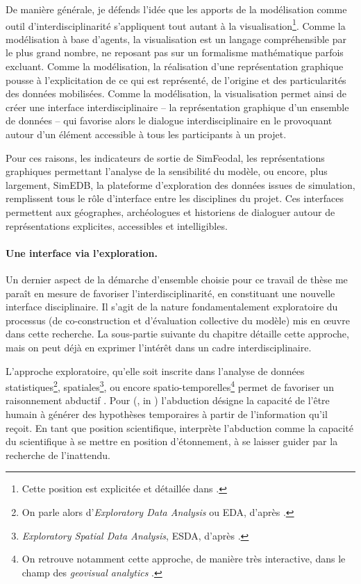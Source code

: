 De manière générale, je défends l'idée que les apports de la modélisation comme outil d'interdisciplinarité s'appliquent tout autant à la visualisation\footnote{
	Cette position est explicitée et détaillée dans \textcite{cura_visualisation_2020}.
}.
Comme la modélisation à base d'agents, la visualisation est un \og langage\fg{} compréhensible par le plus grand nombre, ne reposant pas sur un formalisme mathématique parfois excluant.
Comme la modélisation, la réalisation d'une représentation graphique pousse à l'explicitation de ce qui est représenté, de l'origine et des particularités des données mobilisées.
Comme la modélisation, la visualisation permet ainsi de créer une interface interdisciplinaire -- la représentation graphique d'un ensemble de données -- qui favorise alors le dialogue interdisciplinaire en le provoquant autour d'un élément accessible à tous les participants à un projet.

Pour ces raisons, les indicateurs de sortie de SimFeodal, les représentations graphiques permettant l'analyse de la sensibilité du modèle, ou encore, plus largement, SimEDB, la plateforme d'exploration des données issues de simulation, remplissent tous le rôle d'interface entre les disciplines du projet.
Ces interfaces permettent aux géographes, archéologues et historiens de dialoguer autour de représentations explicites, accessibles et intelligibles.


\paragraph{Une interface via l'exploration.}

Un dernier aspect de la démarche d'ensemble choisie pour ce travail de thèse me paraît en mesure de favoriser l'interdisciplinarité, en constituant une nouvelle interface disciplinaire.
Il s'agit de la nature fondamentalement exploratoire du processus (de co-construction et d'évaluation collective du modèle) mis en œuvre dans cette recherche.
La sous-partie suivante du chapitre détaille cette approche, mais on peut déjà en exprimer l'intérêt dans un cadre interdisciplinaire.

L'approche exploratoire, qu'elle soit inscrite dans l'analyse de données statistiques\footnote{
On parle alors d'\textit{Exploratory Data Analysis} ou \og EDA\fg{}, d'après \textcite{tukey_exploratory_1977}.
}, spatiales\footnote{
\textit{Exploratory Spatial Data Analysis}, \og ESDA\fg{}, d'après \textcites{brunsdon_exploratory_1998,haining_exploratory_1998}.
}, ou encore spatio-temporelles\footnote{
	On retrouve notamment cette approche, de manière très interactive, dans le champ des \textit{geovisual analytics} \autocite{andrienko_exploratory_2006}.
} permet de favoriser un raisonnement abductif \autocite{banos2005voie}.
Pour \citeauthor{yu_abduction_1994} (\citeyear{yu_abduction_1994}, in \textcite[2]{banos2005voie}) l'abduction désigne la \og capacité de l'être humain à générer des hypothèses temporaires à partir de l'information qu'il reçoit\fg{}.
En tant que position scientifique, \textcite[2]{banos2005voie} interprète l'abduction comme \og la capacité du scientifique à se mettre en position d’étonnement, à se laisser guider par la recherche de l'inattendu\fg{}.

